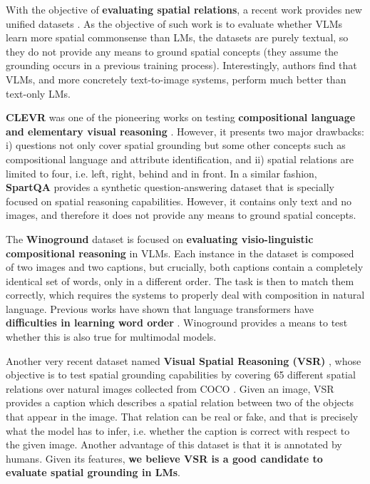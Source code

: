With the objective of \textbf{evaluating spatial relations}, a recent work provides new unified datasets \cite{liu2022things}. As the objective of such work is to evaluate whether VLMs learn more spatial commonsense than LMs, the datasets are purely textual, so they do not provide any means to ground spatial concepts (they assume the grounding occurs in a previous training process). Interestingly, authors find that VLMs, and more concretely text-to-image systems, perform much better than text-only LMs. 

\textbf{CLEVR} was one of the pioneering works on testing \textbf{compositional language and elementary visual reasoning} \cite{johnson2017clevr}. However, it presents two major drawbacks: i) questions not only cover spatial grounding but some other concepts such as compositional language and attribute identification, and ii) spatial relations are limited to four, i.e. left, right, behind and in front. In a similar fashion, \textbf{SpartQA} provides a synthetic question-answering dataset that is specially focused on spatial reasoning capabilities. However, it contains only text and no images, and therefore it does not provide any means to ground spatial concepts. 

The \textbf{Winoground} dataset \cite{thrush2022winoground} is focused on \textbf{evaluating visio-linguistic compositional reasoning} in VLMs. Each instance in the dataset is composed of two images and two captions, but crucially, both captions contain a completely identical set of words, only in a different order. The task is then to match them correctly, which requires the systems to properly deal with composition in natural language. Previous works have shown that language transformers have \textbf{difficulties in learning word order} \cite{sinha2020unnatural,sinha2021matterslittle}. Winoground provides a means to test whether this is also true for multimodal models.

Another very recent dataset named \textbf{Visual Spatial Reasoning (VSR)} \cite{liu2022visual}, whose objective is to test spatial grounding capabilities by covering 65 different spatial relations over natural images collected from COCO \cite{lin2014microsoft}. Given an image, VSR provides a caption which describes a spatial relation between two of the objects that appear in the image. That relation can be real or fake, and that is precisely what the model has to infer, i.e. whether the caption is correct with respect to the given image. Another advantage of this dataset is that it is annotated by humans. Given its features, \textbf{we believe VSR is a good candidate to evaluate spatial grounding in LMs}.

